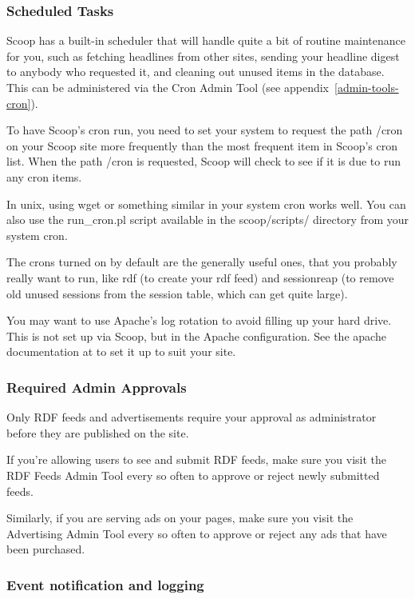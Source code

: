 \subsubsection{Scheduled Tasks}

Scoop has a built-in scheduler that will handle quite a bit of routine maintenance for you, such as fetching headlines from other sites, sending your headline digest to anybody who requested it, and cleaning out unused items in the database.  This can be administered via the Cron Admin Tool (see appendix~\ref{admin-tools-cron}).

To have Scoop's cron run, you need to set your system to request the path /cron on your Scoop site more frequently than the most frequent item in Scoop's cron list.  When the path /cron is requested, Scoop will check to see if it is due to run any cron items.

In unix, using wget or something similar in your system cron works well.  You can also use the run\_cron.pl script available in the scoop/scripts/ directory from your system cron.

The crons turned on by default are the generally useful ones, that you probably really want to run, like rdf (to create your rdf feed) and sessionreap (to remove old unused sessions from the session table, which can get quite large).

You may want to use Apache's log rotation to avoid filling up your hard drive.  This is not set up via Scoop, but in the Apache configuration. See the apache documentation at  to set it up to suit your site.

\subsubsection{Required Admin Approvals}

Only RDF feeds and advertisements require your approval as administrator before they are published on the site.

If you're allowing users to see and submit RDF feeds, make sure you visit the RDF Feeds Admin Tool every so often to approve or reject newly submitted feeds.

Similarly, if you are serving ads on your pages, make sure you visit the Advertising Admin Tool every so often to approve or reject any ads that have been purchased.

\subsubsection{Event notification and logging}
\label{routine-hooks}

